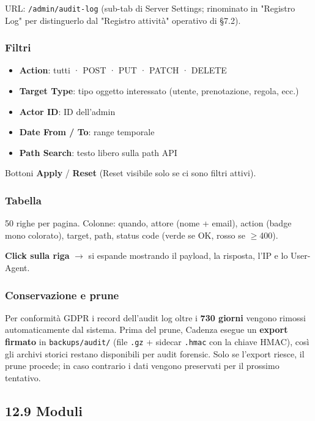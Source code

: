 \documentclass[11pt,a4paper]{article}
\begin{document}
URL: \texttt{/admin/audit-log} (sub-tab di Server Settings; rinominato in "Registro Log" per distinguerlo dal "Registro attività" operativo di §7.2).

\subsubsection{Filtri}


\begin{itemize}
  \item \textbf{Action}: tutti · POST · PUT · PATCH · DELETE
  \item \textbf{Target Type}: tipo oggetto interessato (utente, prenotazione, regola, ecc.)
  \item \textbf{Actor ID}: ID dell'admin
  \item \textbf{Date From / To}: range temporale
  \item \textbf{Path Search}: testo libero sulla path API
\end{itemize}

Bottoni \textbf{Apply} / \textbf{Reset} (Reset visibile solo se ci sono filtri attivi).

\subsubsection{Tabella}


50 righe per pagina. Colonne: quando, attore (nome + email), action (badge mono colorato), target, path, status code (verde se OK, rosso se $\geq$400).

\textbf{Click sulla riga} $\rightarrow$ si espande mostrando il payload, la risposta, l'IP e lo User-Agent.

\subsubsection{Conservazione e prune}


Per conformità GDPR i record dell'audit log oltre i \textbf{730 giorni} vengono rimossi automaticamente dal sistema. Prima del prune, Cadenza esegue un \textbf{export firmato} in \texttt{backups/audit/} (file \texttt{.gz} + sidecar \texttt{.hmac} con la chiave HMAC), così gli archivi storici restano disponibili per audit forensic. Solo se l'export riesce, il prune procede; in caso contrario i dati vengono preservati per il prossimo tentativo.

\subsection{12.9 Moduli}
\end{document}
